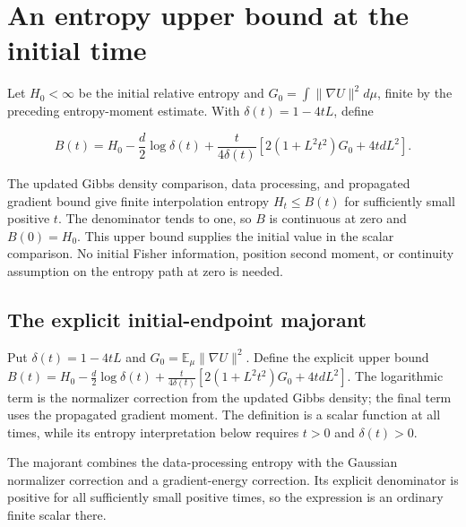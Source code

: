 \documentclass[11pt,a4paper]{report}
\begin{document}
\section{\texorpdfstring{An entropy upper bound at the initial time}{An entropy upper bound at the initial time}}
\label{proof-module-UnadjustedLangevin-LSI-InitialEntropy-lean}


Let \(H_0<\infty\) be the initial relative entropy and \(G_0=\int\|\nabla U\|^2d\mu\), finite by the preceding entropy-moment estimate. With \(\delta(t)=1-4tL\), define

\[B(t)=H_0-\frac d2\log\delta(t)+\frac{t}{4\delta(t)}\left[2(1+L^2t^2)G_0+4tdL^2\right].\]

The updated Gibbs density comparison, data processing, and propagated gradient bound give finite interpolation entropy \(H_t\le B(t)\) for sufficiently small positive \(t\). The denominator tends to one, so \(B\) is continuous at zero and \(B(0)=H_0\). This upper bound supplies the initial value in the scalar comparison. No initial Fisher information, position second moment, or continuity assumption on the entropy path at zero is needed.

\subsection{\texorpdfstring{The explicit initial-endpoint majorant}{The explicit initial-endpoint majorant}}
\label{report-step-UnadjustedLangevin-LSI-InitialEntropy-lean-1}


Put \(\delta(t)=1-4tL\) and \(G_0=\mathbb E_\mu\|\nabla U\|^2\). Define the explicit upper bound \(B(t)=H_0-\frac d2\log\delta(t)+\frac{t}{4\delta(t)}[2(1+L^2t^2)G_0+4tdL^2]\). The logarithmic term is the normalizer correction from the updated Gibbs density; the final term uses the propagated gradient moment. The definition is a scalar function at all times, while its entropy interpretation below requires \(t>0\) and \(\delta(t)>0\).



The majorant combines the data-processing entropy with the Gaussian normalizer correction and a gradient-energy correction. Its explicit denominator is positive for all sufficiently small positive times, so the expression is an ordinary finite scalar there.
\end{document}

